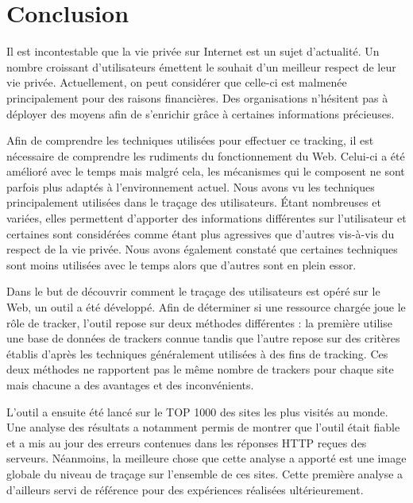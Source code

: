 \chapter{Conclusion}
Il est incontestable que la vie privée sur Internet est un sujet d'actualité. Un nombre croissant d'utilisateurs émettent le souhait d'un meilleur respect de leur vie privée. Actuellement, on peut considérer que celle-ci est malmenée principalement pour des raisons financières. Des organisations n'hésitent pas à déployer des moyens afin de s'enrichir grâce à certaines informations précieuses.
\newline

Afin de comprendre les techniques utilisées pour effectuer ce tracking, il est nécessaire de comprendre les rudiments du fonctionnement du Web. Celui-ci a été amélioré avec le temps mais malgré cela, les mécanismes qui le composent ne sont parfois plus adaptés à l'environnement actuel. Nous avons vu les techniques principalement utilisées dans le traçage des utilisateurs. Étant nombreuses et variées, elles permettent d'apporter des informations différentes sur l'utilisateur et certaines sont considérées comme étant plus agressives que d'autres vis-à-vis du respect de la vie privée. Nous avons également constaté que certaines techniques sont moins utilisées avec le temps alors que d'autres sont en plein essor.
\newline

Dans le but de découvrir comment le traçage des utilisateurs est opéré sur le Web, un outil a été développé. Afin de déterminer si une ressource chargée joue le rôle de tracker, l'outil repose sur deux méthodes différentes : la première utilise une base de données de trackers connue tandis que l'autre repose sur des critères établis d'après les techniques généralement utilisées à des fins de tracking. Ces deux méthodes ne rapportent pas le même nombre de trackers pour chaque site mais chacune a des avantages et des inconvénients.
\newline

L'outil a ensuite été lancé sur le TOP 1000 des sites les plus visités au monde. Une analyse des résultats a notamment permis de montrer que l'outil était fiable et a mis au jour des erreurs contenues dans les réponses HTTP reçues des serveurs. Néanmoins, la meilleure chose que cette analyse a apporté est une image globale du niveau de traçage sur l'ensemble de ces sites. Cette première analyse a d'ailleurs servi de référence pour des expériences réalisées ultérieurement.
\newline

